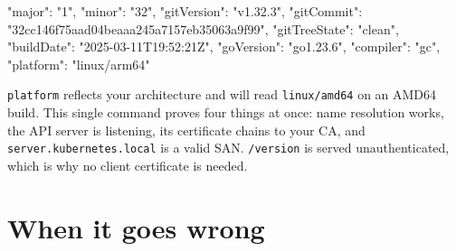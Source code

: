 \documentclass[11pt,oneside]{report}
\begin{document}
\begin{outlst}
{
  "major": "1",
  "minor": "32",
  "gitVersion": "v1.32.3",
  "gitCommit": "32cc146f75aad04beaaa245a7157eb35063a9f99",
  "gitTreeState": "clean",
  "buildDate": "2025-03-11T19:52:21Z",
  "goVersion": "go1.23.6",
  "compiler": "gc",
  "platform": "linux/arm64"
}
\end{outlst}

\texttt{platform}
reflects your
architecture and
will read
\texttt{linux/amd64}
on an AMD64 build.
This single command
proves four things
at once: name
resolution works,
the API server is
listening, its
certificate chains
to your CA, and
\texttt{server.}\allowbreak{}\texttt{kubernetes.}\allowbreak{}\texttt{local}
is a valid SAN.
\texttt{/version} is
served
unauthenticated,
which is why no
client certificate
is needed.

\hypertarget{when-it-goes-wrong-7}{%
\section{When it
goes
wrong}\label{when-it-goes-wrong-7}}
\end{document}
